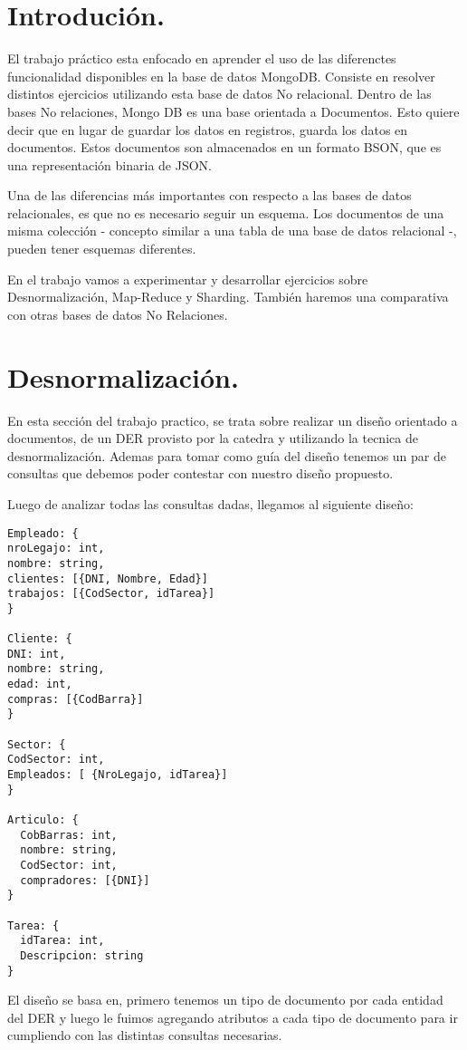 \section{Introdución.}
El trabajo práctico esta enfocado en aprender el uso de las diferenctes funcionalidad disponibles en la base de datos MongoDB. Consiste en resolver distintos ejercicios utilizando esta base de datos No relacional. Dentro de las bases No relaciones, Mongo DB es una base orientada a Documentos. Esto quiere decir que en lugar de guardar los datos en registros, guarda los datos en documentos. Estos documentos son almacenados en un formato BSON, que es una representación binaria de JSON.

Una de las diferencias más importantes con respecto a las bases de datos relacionales, es que no es necesario seguir un esquema. Los documentos de una misma colección - concepto similar a una tabla de una base de datos relacional -, pueden tener esquemas diferentes.

En el trabajo vamos a experimentar y desarrollar ejercicios sobre Desnormalización, Map-Reduce y Sharding. También haremos una comparativa con otras bases de datos No Relaciones.

\section{Desnormalización.}
En esta sección del trabajo practico, se trata sobre realizar un diseño orientado a documentos, de un DER provisto por la catedra y utilizando la tecnica de desnormalización. Ademas para tomar como guía del diseño tenemos un par de consultas que debemos poder contestar con nuestro diseño propuesto.

Luego de analizar todas las consultas dadas, llegamos al siguiente diseño:

\begin{lstlisting}
Empleado: {
nroLegajo: int,
nombre: string,
clientes: [{DNI, Nombre, Edad}]
trabajos: [{CodSector, idTarea}]
}

Cliente: {
DNI: int,
nombre: string,
edad: int,
compras: [{CodBarra}]
}

Sector: {
CodSector: int,
Empleados: [ {NroLegajo, idTarea}]
}

Articulo: {
  CobBarras: int,
  nombre: string,
  CodSector: int,
  compradores: [{DNI}]
}

Tarea: {
  idTarea: int,
  Descripcion: string
}

\end{lstlisting}
El diseño se basa en, primero tenemos un tipo de documento por cada entidad del DER y luego le fuimos agregando atributos a cada tipo de documento para ir cumpliendo con las distintas consultas necesarias.

